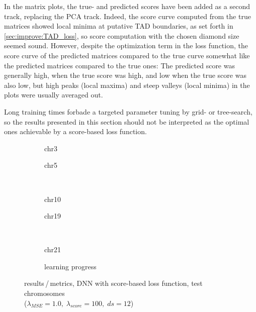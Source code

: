 In the matrix plots, the true- and predicted scores have been added as a second track, replacing the PCA track. 
Indeed, the score curve computed from the true matrices showed local minima at putative TAD boundaries, as set forth in \ref{sec:improve:TAD_loss},
so score computation with the chosen diamond size seemed sound.
However, despite the optimization term in the loss function, the score curve of the predicted matrices compared to the true curve 
somewhat like the predicted matrices compared to the true ones:
The predicted score was generally high, when the true score was high, and low when the true score was also low,
but high peaks (local maxima) and steep valleys (local minima) in the plots were usually averaged out.

Long training times forbade a targeted parameter tuning by grid- or tree-search,
so the results presented in this section should not be interpreted as the optimal ones achievable by a score-based loss function.
\begin{figure}[p]%
    \begin{subfigure}{0.45\textwidth}
        \scriptsize
        \caption{chr3}
    \end{subfigure} \hfill
    \begin{subfigure}{0.45\textwidth}
        \scriptsize
        \caption{chr5}
    \end{subfigure}\\[5mm]
    \begin{subfigure}{0.45\textwidth}
        \scriptsize
        \caption{chr10}
    \end{subfigure}\hfill
    \begin{subfigure}{0.45\textwidth}
        \scriptsize
        \caption{chr19}
    \end{subfigure}\\[3mm]
    \begin{subfigure}{0.45\textwidth}
        \scriptsize
        \caption{chr21}
    \end{subfigure}\hfill
    \begin{subfigure}{0.45\textwidth}
        \caption{learning progress} \label{fig:results:scoreLossDNN_lossEpochs}
    \end{subfigure}
    \caption{results\,/\,metrics, DNN with score-based loss function, test chromosomes\\ ($\lambda_\mathit{MSE}=1.0,\; \lambda_\mathit{score}=100,\; ds=12$)} \label{fig:results:scoreLossDNN_pearson}
\end{figure}
